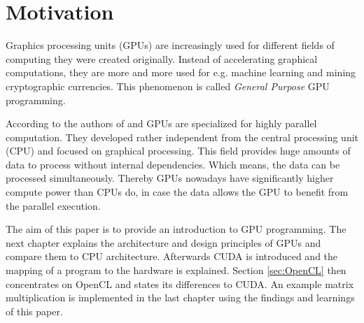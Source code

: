 \section{Motivation}
  Graphics processing units (GPUs) are increasingly used for different fields of computing they were created originally.
  Instead of accelerating graphical computations, they are more and more used for e.g. machine learning and mining cryptographic currencies.
  This phenomenon is called \textit{General Purpose} GPU programming.~\cite{8363085}~\cite{Owens.2008}
  
    According to the authors of \cite{NVIDIA.2019} and \cite{Rauber.2012} GPUs are specialized for highly parallel computation.
    They developed rather independent from the central processing unit (CPU) and focused on graphical processing.
    This field provides huge amounts of data to process without internal dependencies.
    Which means, the data can be processed simultaneously.
    Thereby GPUs nowadays have significantly higher compute power than CPUs do, in case the data allows the GPU to benefit from the parallel execution.
    
    The aim of this paper is to provide an introduction to GPU programming.
    The next chapter explains the architecture and design principles of GPUs and compare them to CPU architecture.
    Afterwards CUDA is introduced and the mapping of a program to the hardware is explained.
    Section \ref{sec:OpenCL} then concentrates on OpenCL and states its differences to CUDA.
    An example matrix multiplication is implemented in the last chapter using the findings and learnings of this paper.